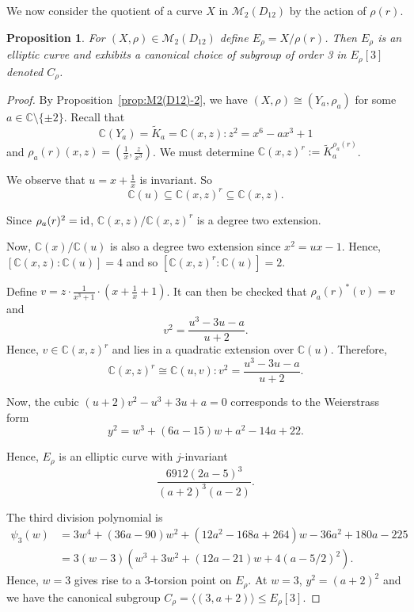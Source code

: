 \documentclass[a4paper,11pt]{amsart}
\numberwithin{equation}{section}
\numberwithin{figure}{section}
\numberwithin{table}{section}
\newtheorem{proposition}[theorem]{Proposition}
\newcommand{\C}{\mathbb{C}}
\begin{document}
We now consider the quotient of a curve $X$ in $\mathcal{M}_{2}(D_{12})$ by the action of $\rho(r)$.

\begin{proposition}\label{prop:M2(D12)-3}
    For $(X,\rho)\in\mathcal{M}_{2}(D_{12})$ define $E_{\rho} = X/\rho(r)$. Then $E_{\rho}$ is an elliptic curve and exhibits a canonical choice of subgroup of order 3 in $E_{\rho}[3]$ denoted $C_{\rho}$.
\end{proposition}

\begin{proof}
    By Proposition~\ref{prop:M2(D12)-2}, we have $(X,\rho)\cong(Y_{a},\rho_{a})$ for some $a\in\C\setminus\{\pm 2\}$. Recall that
    \[\C(Y_{a}) = \widetilde{K}_{a} = \C(x,z): z^2 = x^6-ax^3+1\]
    and $\rho_{a}(r)(x,z) = \left(\frac{1}{x},\frac{z}{x^3}\right)$. We must determine $\C(x,z)^{r}:=\widetilde{K}_{a}^{\rho_{a}(r)}$.

    We observe that $u = x + \frac{1}{x}$ is invariant. So
    \[\C(u)\subseteq\C(x,z)^{r}\subseteq\C(x,z).\]
    
    Since $\rho_{a}(r)^2 = {\rm id}$, $\C(x,z)/\C(x,z)^{r}$ is a degree two extension.

    Now, $\C(x)/\C(u)$ is also a degree two extension since $x^2 = ux - 1$. Hence, $[\C(x,z):\C(u)] = 4$ and so $[\C(x,z)^{r}:\C(u)] = 2$.

    Define $v = z\cdot\frac{1}{x^3+1}\cdot(x+\frac{1}{x}+1)$. It can then be checked that $\rho_{a}(r)^{*}(v) = v$ and 
    \[v^2 = \frac{u^3-3u-a}{u+2}.\]
    Hence, $v\in\C(x,z)^{r}$ and lies in a quadratic extension over $\C(u)$. Therefore,
    \[\C(x,z)^{r} \cong \C(u,v): v^2 = \frac{u^3-3u-a}{u+2}.\]

    Now, the cubic $(u+2)v^2 - u^3+3u+a = 0$ corresponds to the Weierstrass form
    \[y^2 = w^3 + (6a-15)w + a^2-14a+22.\]

    Hence, $E_{\rho}$ is an elliptic curve with $j$-invariant
    \[\frac{6912(2a-5)^3}{(a+2)^3(a-2)}.\]

    The third division polynomial is
    \begin{align*}\psi_{3}(w) &= 3w^4+(36a-90)w^2+(12a^2-168a+264)w-36a^2+180a-225 \\
    &= 3(w-3)(w^3+3w^2+(12a-21)w+4(a-5/2)^2).
    \end{align*}
    Hence, $w = 3$ gives rise to a 3-torsion point on $E_{\rho}$. At $w = 3$, $y^2 = (a+2)^2$ and we have the canonical subgroup $C_{\rho} = \langle(3,a+2)\rangle\leq E_{\rho}[3].$
\end{proof}
\end{document}
